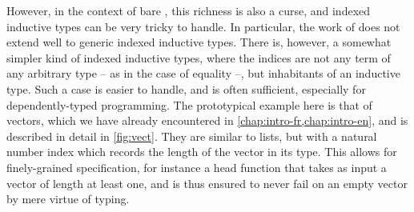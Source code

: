However, in the context of bare , this richness is also
a curse, and indexed inductive types can be very tricky to handle. In particular, the
work of  does not extend well to generic indexed inductive types.
There is, however, a somewhat simpler kind of indexed inductive types, where the indices are
not any term of any arbitrary type – as in the case of equality –,
but inhabitants of an inductive type.
Such a case is easier to handle, and is often sufficient, especially for
dependently-typed programming. The prototypical example here is that of vectors, which
we have already encountered in \cref{chap:intro-fr,chap:intro-en}, and is described in
detail in \cref{fig:vect}. They are similar to
lists, but with a natural number index which records the length of the vector in its type.
This allows for finely-grained specification, for instance a head function that takes as input 
a vector of length at least one, and is thus ensured to never fail on an empty vector
by mere virtue of typing.

\begin{figure*}
  \caption{Vector type}
  \label{fig:vect}
  \end{figure*}

